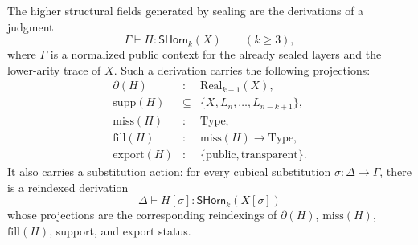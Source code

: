 \documentclass{lmcs}
\newcommand{\Type}{\mathrm{Type}}
\begin{document}
\begin{defi}
\label{def:structural-horn-grammar}
The higher structural fields generated by sealing are the derivations of a judgment
\[
  \Gamma\vdash H:\mathsf{SHorn}_k(X)
  \qquad (k\geq 3),
\]
where \(\Gamma\) is a normalized public context for the already sealed layers and the
lower-arity trace of \(X\).  Such a derivation carries the following projections:
\[
\begin{array}{rcl}
  \partial(H) &:& \mathrm{Real}_{k-1}(X),\\
  \mathrm{supp}(H) &\subseteq& \{X,L_n,\ldots,L_{n-k+1}\},\\
  \mathrm{miss}(H) &:& \Type,\\
  \mathrm{fill}(H) &:& \mathrm{miss}(H)\to\Type,\\
  \mathrm{export}(H) &:& \{\mathrm{public},\mathrm{transparent}\}.
\end{array}
\]
It also carries a substitution action: for every cubical substitution
\(\sigma:\Delta\to\Gamma\), there is a reindexed derivation
\[
  \Delta\vdash H[\sigma]:\mathsf{SHorn}_k(X[\sigma])
\]
whose projections are the corresponding reindexings of \(\partial(H)\), \(\mathrm{miss}(H)\),
\(\mathrm{fill}(H)\), support, and export status.


\end{defi}
\end{document}
